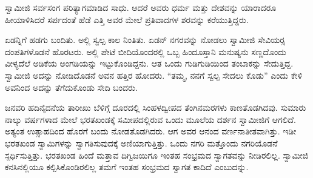  ಸ್ವಾಮೀಜಿ ಸರ್ವಸಂಗ ಪರಿತ್ಯಾಗಮಾಡಿದ ಸಾಧು. ಆದರೆ ಅವರು ಧರ್ಮ ಮತ್ತು ದೇಶವನ್ನು ಯಾರಾದರೂ ಹೀಯಾಳಿಸಿದರೆ ಸರ್ಪದಂತೆ ಹೆಡೆ ಎತ್ತಿ ಅವರ ಮೇಲೆ ಪ್ರತಿವಾದಗಳ ಶರವನ್ನು ಕರೆಯುತ್ತಿದ್ದರು. 

 ಏಡನ್ನಿಗೆ ಹಡಗು ಬಂದಿತು. ಅಲ್ಲಿ ಸ್ವಲ್ಪ ಕಾಲ ನಿಂತಿತು. ಏಡನ್ ನಗರವನ್ನು ನೋಡಲು ಸ್ವಾಮೀಜಿ ಸೇವಿಯರ‍್ಸ ದಂಪತಿಗಳೊಡನೆ ಹೊರಟರು. ಅಲ್ಲಿ ಪೇಟೆ ಬೀದಿಯೊಂದರಲ್ಲಿ ಒಬ್ಬ ಹಿಂದೂಸ್ತಾನಿ ಮನುಷ್ಯನು ಸಣ್ಣದೊಂದು ವೀಳ್ಯದೆಲೆ ಅಡಿಕೆಯ ಅಂಗಡಿಯನ್ನು ಇಟ್ಟುಕೊಂಡಿದ್ದನು. ಆತ ಒಂದು ಗುಡಿಗುಡಿಯಿಂದ ತಂಬಾಕನ್ನು ಸೇದುತ್ತಿದ್ದ. ಸ್ವಾಮೀಜಿ ಅದನ್ನು ನೋಡಿದೊಡನೆ ಅವನ ಹತ್ತಿರ ಹೋದರು. “ತಮ್ಮ, ನನಗೆ ಸ್ವಲ್ಪ ಸೇದಲು ಕೊಡು” ಎಂದು ಕೇಳಿ ಅವನಿಂದ ಅದನ್ನು ತೆಗೆದುಕೊಂಡು ಸೇದಿ ಬಂದರು. 

 ಜನವರಿ ಹದಿನೈದನೆಯ ತಾರೀಖು ಬೆಳಿಗ್ಗೆ ದೂರದಲ್ಲಿ ಸಿಂಹಳದ್ವೀಪದ ತೆಂಗಿನಮರಗಳು ಕಾಣತೊಡಗಿದವು. ಸುಮಾರು ನಾಲ್ಕು ವರ್ಷಗಳಾದ ಮೇಲೆ ಭರತಖಂಡಕ್ಕೆ ಸಮೀಪದಲ್ಲಿರುವ ಒಂದು ಮೂಲೆಯ ದರ್ಶನ ಸ್ವಾಮೀಜಿಗೆ ಆಗಲಿದೆ. ಅತ್ಯಂತ ಉತ್ಸಾಹದಿಂದ ಹೊರಗೆ ಬಂದು ನೋಡತೊಡಗಿದರು. ಆಗ ಅವರ ಆನಂದ ವರ್ಣನಾತೀತವಾಗಿತ್ತು. ಇಡೀ ಭರತಖಂಡ ಸ್ವಾಮಿಗಳನ್ನು ಸ್ವಾಗತಿಸುವುದಕ್ಕೆ ಅಣಿಯಾಗುತ್ತಿತ್ತು. ಒಂದು ನಗರಿ ಮತ್ತೊಂದು ನಗರಿಯೊಡನೆ ಸ್ಪರ್ಧಿಸುತ್ತಿತ್ತು. ಭರತಖಂಡ ಹಿಂದೆ ಮತ್ತಾವ ದಿಗ್ವಿಜಯಿಗೂ ಇಂತಹ ಸಂಭ್ರಮದ ಸ್ವಾಗತವನ್ನು ನೀಡಿರಲಿಲ್ಲ. ಸ್ವಾಮೀಜಿ ಕನಸಿನಲ್ಲಿಯೂ ಕಲ್ಪಿಸಿಕೊಂಡಿರಲಿಲ್ಲ ತಮಗೆ ಇಂತಹ ಸಂಭ್ರಮದ ಸ್ವಾಗತ ಕಾದಿದೆ ಎಂಬುದನ್ನು. 

